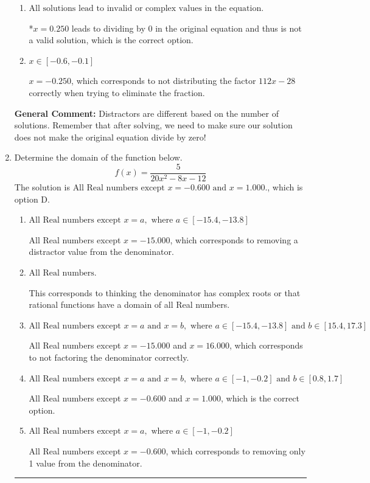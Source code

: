 \documentclass{extbook}[14pt]
\newcommand{\litem}[1]{\item #1

\rule{\textwidth}{0.4pt}}
\begin{document}
\begin{enumerate}
{\begin{enumerate}[label=\Alph*.]
$x = 0.250 \text{ and } x = 0.250$, which corresponds to getting the correct solution and believing there should be a second solution to the equation.
\item \( \text{All solutions lead to invalid or complex values in the equation.} \)

*$x = 0.250$ leads to dividing by 0 in the original equation and thus is not a valid solution, which is the correct option.
\item \( x \in [-0.6,-0.1] \)

$x = -0.250$, which corresponds to not distributing the factor $112x -28$ correctly when trying to eliminate the fraction.
\end{enumerate}

\textbf{General Comment:} Distractors are different based on the number of solutions. Remember that after solving, we need to make sure our solution does not make the original equation divide by zero!
}
\litem{
Determine the domain of the function below.
\[ f(x) = \frac{5}{20x^{2} -8 x -12} \]The solution is \( \text{All Real numbers except } x = -0.600 \text{ and } x = 1.000. \), which is option D.\begin{enumerate}[label=\Alph*.]
\item \( \text{All Real numbers except } x = a, \text{ where } a \in [-15.4, -13.8] \)

All Real numbers except $x = -15.000$, which corresponds to removing a distractor value from the denominator.
\item \( \text{All Real numbers.} \)

This corresponds to thinking the denominator has complex roots or that rational functions have a domain of all Real numbers.
\item \( \text{All Real numbers except } x = a \text{ and } x = b, \text{ where } a \in [-15.4, -13.8] \text{ and } b \in [15.4, 17.3] \)

All Real numbers except $x = -15.000$ and $x = 16.000$, which corresponds to not factoring the denominator correctly.
\item \( \text{All Real numbers except } x = a \text{ and } x = b, \text{ where } a \in [-1, -0.2] \text{ and } b \in [0.8, 1.7] \)

All Real numbers except $x = -0.600$ and $x = 1.000$, which is the correct option.
\item \( \text{All Real numbers except } x = a, \text{ where } a \in [-1, -0.2] \)

All Real numbers except $x = -0.600$, which corresponds to removing only 1 value from the denominator.
\end{enumerate}

}
\end{enumerate}
\end{document}
